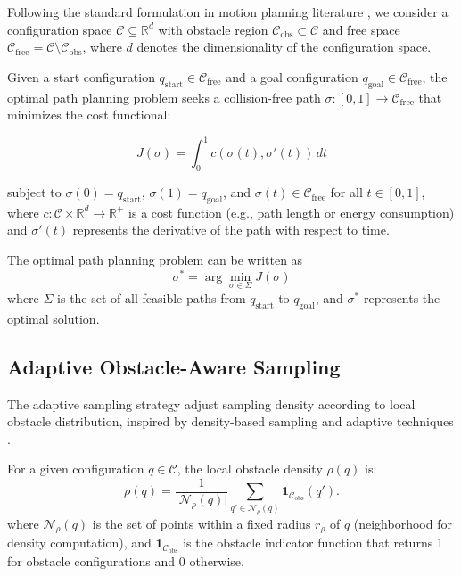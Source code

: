 \documentclass[pdflatex,sn-mathphys-num]{sn-jnl}
\theoremstyle{thmstyleone}%
\theoremstyle{thmstyletwo}%
\theoremstyle{thmstylethree}%
\begin{document}
Following the standard formulation in motion planning literature \cite{4}, we consider a configuration space $\mathcal{C} \subseteq \mathbb{R}^d$ with obstacle region $\mathcal{C}_{\mathrm{obs}} \subset \mathcal{C}$ and free space $\mathcal{C}_{\mathrm{free}} = \mathcal{C} \setminus \mathcal{C}_{\mathrm{obs}}$, where $d$ denotes the dimensionality of the configuration space. 

Given a start configuration $q_{\mathrm{start}} \in \mathcal{C}_{\mathrm{free}}$ and a goal configuration $q_{\mathrm{goal}} \in \mathcal{C}_{\mathrm{free}}$, the optimal path planning problem seeks a collision-free path $\sigma: [0,1] \rightarrow \mathcal{C}_{\mathrm{free}}$ that minimizes the cost functional:

\begin{equation}
    J(\sigma) = \int_0^1 c(\sigma(t), \sigma'(t)) \, dt
\end{equation}

subject to $\sigma(0) = q_{\mathrm{start}}$, $\sigma(1) = q_{\mathrm{goal}}$, and $\sigma(t) \in \mathcal{C}_{\mathrm{free}}$ for all $t \in [0,1]$, where $c: \mathcal{C} \times \mathbb{R}^d \rightarrow \mathbb{R}^+$ is a cost function (e.g., path length or energy consumption) and $\sigma'(t)$ represents the derivative of the path with respect to time.

The optimal path planning problem can be written as
\begin{equation}
    \sigma^* = \arg\min_{\sigma \in \Sigma} J(\sigma)
\end{equation}
where $\Sigma$ is the set of all feasible paths from $q_{\mathrm{start}}$ to $q_{\mathrm{goal}}$, and $\sigma^*$ represents the optimal solution.

\subsection{Adaptive Obstacle-Aware Sampling}\label{subsec3}

The adaptive sampling strategy adjust sampling density according to local obstacle distribution, inspired by density-based sampling \cite{31} and adaptive techniques \cite{3}.

For a given configuration $q \in \mathcal{C}$, the local obstacle density $\rho(q)$ is:
\begin{equation}
    \rho(q) = \frac{1}{\lvert \mathcal{N}_\rho(q) \rvert}
    \sum_{q' \in \mathcal{N}_\rho(q)} \mathbf{1}_{\mathcal{C}_{\mathrm{obs}}}(q').
\end{equation}
where $\mathcal{N}_\rho(q)$ is the set of points within a fixed radius $r_\rho$ of $q$ (neighborhood for density computation), and $\mathbf{1}_{\mathcal{C}_{\mathrm{obs}}}$ is the obstacle indicator function that returns 1 for obstacle configurations and 0 otherwise.
\end{document}
